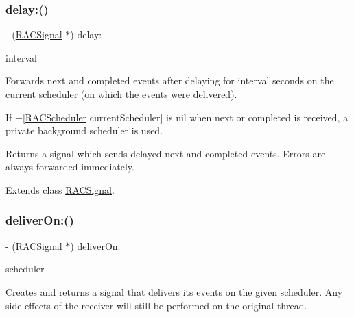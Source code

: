 \subsubsection{\texorpdfstring{delay\+:()}{delay:()}\hspace{0.1cm}{\footnotesize\ttfamily [3/3]}}
{\footnotesize\ttfamily -\/ (\mbox{\hyperlink{interface_r_a_c_signal}{R\+A\+C\+Signal}} $\ast$) delay\+: \begin{DoxyParamCaption}\item[{(N\+S\+Time\+Interval)}]{interval }\end{DoxyParamCaption}}

Forwards {\ttfamily next} and {\ttfamily completed} events after delaying for {\ttfamily interval} seconds on the current scheduler (on which the events were delivered).

If +\mbox{[}\mbox{\hyperlink{interface_r_a_c_scheduler}{R\+A\+C\+Scheduler}} current\+Scheduler\mbox{]} is nil when {\ttfamily next} or {\ttfamily completed} is received, a private background scheduler is used.

Returns a signal which sends delayed {\ttfamily next} and {\ttfamily completed} events. Errors are always forwarded immediately. 

Extends class \mbox{\hyperlink{interface_r_a_c_signal_adc28e5c64d2e6ec8c5ab8465fa6c89b4}{R\+A\+C\+Signal}}.

\mbox{\label{category_r_a_c_signal_07_operations_08_a69e4dc1c476da42ed829caed84fbd258}} 
\subsubsection{\texorpdfstring{deliver\+On\+:()}{deliverOn:()}\hspace{0.1cm}{\footnotesize\ttfamily [1/3]}}
{\footnotesize\ttfamily -\/ (\mbox{\hyperlink{interface_r_a_c_signal}{R\+A\+C\+Signal}} $\ast$) deliver\+On\+: \begin{DoxyParamCaption}\item[{(\mbox{\hyperlink{interface_r_a_c_scheduler}{R\+A\+C\+Scheduler}} $\ast$)}]{scheduler }\end{DoxyParamCaption}}

Creates and returns a signal that delivers its events on the given scheduler. Any side effects of the receiver will still be performed on the original thread.

